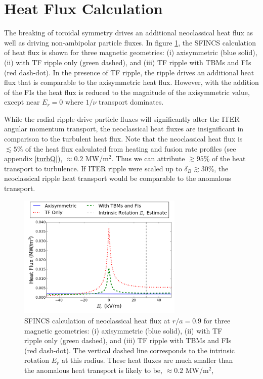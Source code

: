 \documentclass{article}
\numberwithin{figure}{section}
\numberwithin{equation}{section}
\begin{document}
\FloatBarrier

\section{Heat Flux Calculation}\label{heatflux}
The breaking of toroidal symmetry drives an additional neoclassical heat flux as well as driving non-ambipolar particle fluxes. In figure \ref{fig:HeatFlux}, the SFINCS calculation of heat flux is shown for three magnetic geometries: (i) axisymmetric (blue solid), (ii) with TF ripple only (green dashed), and (iii) TF ripple with TBMs and FIs (red dash-dot). In the presence of TF ripple, the ripple drives an additional heat flux that is comparable to the axisymmetric heat flux. However, with the addition of the FIs the heat flux is reduced to the magnitude of the axisymmetric value, except near $E_r = 0$ where $1/\nu$ transport dominates. 

While the radial ripple-drive particle fluxes will significantly alter the ITER angular momentum transport, the neoclassical heat fluxes are insignificant in comparison to the turbulent heat flux. Note that the neoclassical heat flux is $\lesssim 5\%$  of the heat flux calculated from heating and fusion rate profiles (see appendix \ref{turbQ}), $\approx 0.2$ MW/m$^2$. Thus we can attribute $\gtrsim 95\%$ of the heat transport to turbulence. If ITER ripple were scaled up to $\delta_B \gtrsim 30\%$, the neoclassical ripple heat transport would be comparable to the anomalous transport.

\begin{figure}[h!]
\centering
\includegraphics[width=0.7\textwidth]
{HeatFlux.png}
\caption{\label{fig:HeatFlux} SFINCS calculation of neoclassical heat flux at $r/a = 0.9$ for three magnetic geometries: (i) axisymmetric (blue solid), (ii) with TF ripple only (green dashed), and (iii) TF ripple with TBMs and FIs (red dash-dot). The vertical dashed line corresponds to the intrinsic rotation $E_r$ at this radius. These heat fluxes are much smaller than the anomalous heat transport is likely to be, $\approx 0.2$ MW/m$^2$,}
\end{figure}
\end{document}
